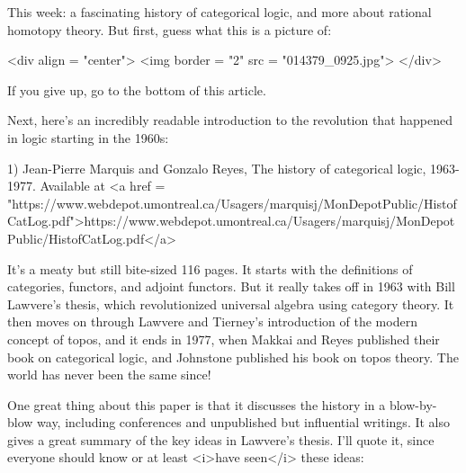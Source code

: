 

This week: a fascinating history of categorical logic, and more about
rational homotopy theory.  But first, guess what this is a picture of:

<div align = "center">
<img border = "2" src = "014379_0925.jpg">
</div>

If you give up, go to the bottom of this article.

Next, here's an incredibly readable introduction to the revolution
that happened in logic starting in the 1960s:

1) Jean-Pierre Marquis and Gonzalo Reyes, The history of categorical
logic, 1963-1977.  Available at
<a href = "https://www.webdepot.umontreal.ca/Usagers/marquisj/MonDepotPublic/HistofCatLog.pdf">https://www.webdepot.umontreal.ca/Usagers/marquisj/MonDepotPublic/HistofCatLog.pdf</a>

It's a meaty but still bite-sized 116 pages.  It starts with the
definitions of categories, functors, and adjoint functors.  But it
really takes off in 1963 with Bill Lawvere's thesis, which
revolutionized universal algebra using category theory.  It then moves
on through Lawvere and Tierney's introduction of the modern concept of
topos, and it ends in 1977, when Makkai and Reyes published their book
on categorical logic, and Johnstone published his book on topos theory.
The world has never been the same since!

One great thing about this paper is that it discusses the history in a
blow-by-blow way, including conferences and unpublished but
influential writings.  It also gives a great summary of the key ideas
in Lawvere's thesis.  I'll quote it, since everyone should know or at
least <i>have seen</i> these ideas:




